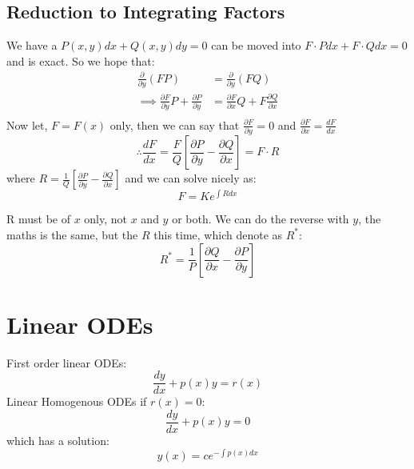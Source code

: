 \documentclass{article}
\newcommand{\di}{\frac{dy}{dx}}
\newcommand{\pd}[2]{\frac{\partial#1}{\partial#2}}
\newcommand{\fd}[2]{\frac{d #1}{d #2}}
\begin{document}
\subsection{Reduction to Integrating Factors}

We have a $P(x, y)dx + Q(x, y)dy = 0 $ can be moved into $F\cdot P dx + F\cdot Q dx = 0$ and is exact.
So we hope that:
\begin{align*}
  \pd{}{y}(FP) &= \pd{}{y}(FQ)\\
  \implies \pd{F}{y}P + \pd{P}{y} &= \pd{F}{x}Q + F\pd{Q}{x}\\
\end{align*}
Now let, $F = F(x)$ only, then we can say that $\displaystyle{\pd{F}{y} = 0}$ and $\displaystyle{\pd{F}{x} = \fd{F}{x}}$
$$ \therefore \fd{F}{x} = \frac{F}{Q}\left[ \pd{P}{y} - \pd{Q}{x} \right] = F \cdot R$$
where $\displaystyle{R = \frac{1}{Q}\left[ \pd{P}{y} - \pd{Q}{x} \right]} $ and we can solve nicely as:
$$ F = Ke^{\int R dx} $$

R must be of $x$ only, not $x$ and $y$ or both. We can do the reverse with $y$, the maths is the same, but the $R$ this time, which denote as $R^*$:
$$ R^* = \frac{1}{P}\left[\pd{Q}{x} - \pd{P}{y} \right] $$

\section{Linear ODEs}

First order linear ODEs:
$$ \di + p(x)y = r(x) $$
Linear Homogenous ODEs if $r(x) = 0 $:
$$ \di + p(x)y = 0 $$
which has a solution:
$$ y(x) = ce^{-\int p(x)dx} $$
\end{document}
